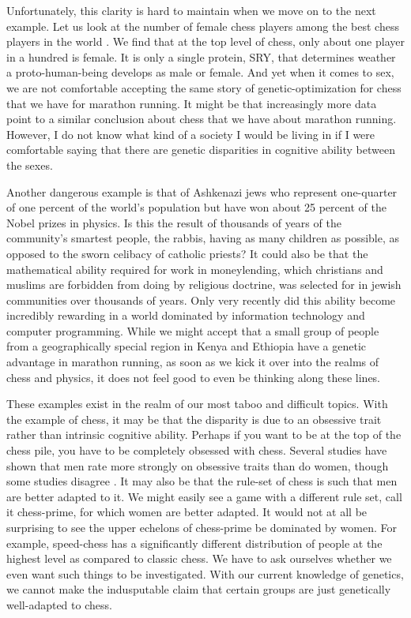 Unfortunately, this clarity is hard to maintain when we move on to the next example.
Let us look at the number of female chess players among the best chess players in the world \cite{chess2020}.
We find that at the top level of chess, only about one player in a hundred is female.
It is only a single protein, SRY, that determines weather a proto-human-being develops as male or female.
And yet when it comes to sex, we are not comfortable accepting the same story of genetic-optimization for chess that we have for marathon running.
It might be that increasingly more data point to a similar conclusion about chess that we have about marathon running.
However, I do not know what kind of a society I would be living in if I were comfortable saying that there are genetic disparities in cognitive ability between the sexes.

Another dangerous example is that of Ashkenazi jews who represent one-quarter of one percent of the world's population but have won about 25 percent of the Nobel prizes in physics.
Is this the result of thousands of years of the community's smartest people, the rabbis, having as many children as possible, as opposed to the sworn celibacy of catholic priests?
It could also be that the mathematical ability required for work in moneylending, which christians and muslims are forbidden from doing by religious doctrine, was selected for in jewish communities over thousands of years.
Only very recently did this ability become incredibly rewarding in a world dominated by information technology and computer programming.
While we might accept that a small group of people from a geographically special region in Kenya and Ethiopia have a genetic advantage in marathon running, as soon as we kick it over into the realms of chess and physics, it does not feel good to even be thinking along these lines.

These examples exist in the realm of our most taboo and difficult topics.
With the example of chess, it may be that the disparity is due to an obsessive trait rather than intrinsic cognitive ability.
Perhaps if you want to be at the top of the chess pile, you have to be completely obsessed with chess.
Several studies have shown that men rate more strongly on obsessive traits than do women, though some studies disagree \cite{Mathis2011}.
It may also be that the rule-set of chess is such that men are better adapted to it.
We might easily see a game with a different rule set, call it chess-prime, for which women are better adapted.
It would not at all be surprising to see the upper echelons of chess-prime be dominated by women.
For example, speed-chess has a significantly different distribution of people at the highest level as compared to classic chess.
We have to ask ourselves whether we even want such things to be investigated.
With our current knowledge of genetics, we cannot make the indusputable claim that certain groups are just genetically well-adapted to chess.

